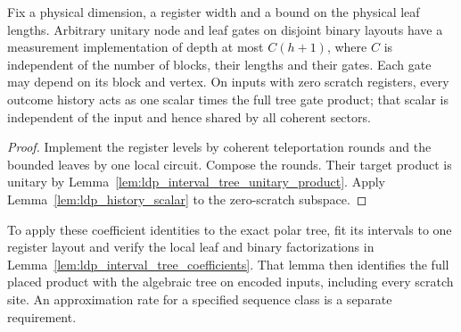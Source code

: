 \begin{lemma}
    \label{lem:ldp_interval_tree_measurement_rounds}
    \leanok
    Fix a physical dimension, a register width and a bound on the physical
    leaf lengths. Arbitrary unitary node and leaf gates on disjoint binary
    layouts have a measurement implementation of depth at most $C(h+1)$,
    where $C$ is independent of the number of blocks, their lengths and
    their gates. Each gate may depend on its block and vertex.
    On inputs with zero scratch registers, every outcome history acts as
    one scalar times the full tree gate product; that scalar is independent
    of the input and hence shared by all coherent sectors.
\end{lemma}
\begin{proof}\leanok
    Implement the register levels by coherent teleportation rounds and
    the bounded leaves by one local circuit. Compose the rounds.
    Their target product is unitary by
    Lemma~\ref{lem:ldp_interval_tree_unitary_product}. Apply
    Lemma~\ref{lem:ldp_history_scalar} to the zero-scratch subspace.
\end{proof}

To apply these coefficient identities to the exact polar tree, fit its
intervals to one register layout and verify the local leaf and binary
factorizations in Lemma~\ref{lem:ldp_interval_tree_coefficients}.
That lemma then identifies the full placed product with the algebraic
tree on encoded inputs, including every scratch site. An approximation
rate for a specified sequence class is a separate requirement.
